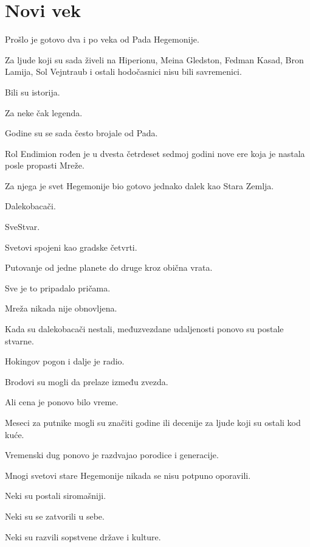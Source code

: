 
\chapter{Novi vek}


Prošlo je gotovo dva i po veka od Pada Hegemonije.

Za ljude koji su sada živeli na Hiperionu, Meina Gledston, Fedman Kasad, Bron Lamija, Sol Vejntraub i ostali hodočasnici nisu bili savremenici.

Bili su istorija.

Za neke čak legenda.

\bigskip

Godine su se sada često brojale od Pada.

Rol Endimion rođen je u dvesta četrdeset sedmoj godini nove ere koja je nastala posle propasti Mreže.

Za njega je svet Hegemonije bio gotovo jednako dalek kao Stara Zemlja.

Dalekobacači.

SveStvar.

Svetovi spojeni kao gradske četvrti.

Putovanje od jedne planete do druge kroz obična vrata.

Sve je to pripadalo pričama.

\bigskip

Mreža nikada nije obnovljena.

Kada su dalekobacači nestali, međuzvezdane udaljenosti ponovo su postale stvarne.

Hokingov pogon i dalje je radio.

Brodovi su mogli da prelaze između zvezda.

Ali cena je ponovo bilo vreme.

Meseci za putnike mogli su značiti godine ili decenije za ljude koji su ostali kod kuće.

Vremenski dug ponovo je razdvajao porodice i generacije.

\bigskip

Mnogi svetovi stare Hegemonije nikada se nisu potpuno oporavili.

Neki su postali siromašniji.

Neki su se zatvorili u sebe.

Neki su razvili sopstvene države i kulture.

